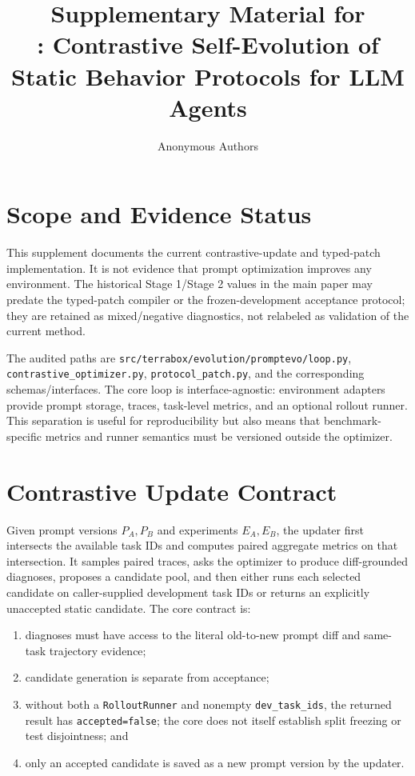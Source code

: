 \documentclass[10pt]{article}
\title{Supplementary Material for \\ \method: Contrastive Self-Evolution of Static Behavior Protocols for LLM Agents}
\author{Anonymous Authors}
\date{}
\begin{document}
\maketitle

\section{Scope and Evidence Status}
This supplement documents the current contrastive-update and typed-patch implementation. It is not evidence that prompt optimization improves any environment. The historical Stage 1/Stage 2 values in the main paper may predate the typed-patch compiler or the frozen-development acceptance protocol; they are retained as mixed/negative diagnostics, not relabeled as validation of the current method.

The audited paths are \texttt{src/terrabox/evolution/promptevo/loop.py}, \texttt{contrastive\_optimizer.py}, \texttt{protocol\_patch.py}, and the corresponding schemas/interfaces. The core loop is interface-agnostic: environment adapters provide prompt storage, traces, task-level metrics, and an optional rollout runner. This separation is useful for reproducibility but also means that benchmark-specific metrics and runner semantics must be versioned outside the optimizer.

\section{Contrastive Update Contract}
Given prompt versions $P_A,P_B$ and experiments $E_A,E_B$, the updater first intersects the available task IDs and computes paired aggregate metrics on that intersection. It samples paired traces, asks the optimizer to produce diff-grounded diagnoses, proposes a candidate pool, and then either runs each selected candidate on caller-supplied development task IDs or returns an explicitly unaccepted static candidate. The core contract is:
\begin{enumerate}
\item diagnoses must have access to the literal old-to-new prompt diff and same-task trajectory evidence;
\item candidate generation is separate from acceptance;
\item without both a \texttt{RolloutRunner} and nonempty \texttt{dev\_task\_ids}, the returned result has \texttt{accepted=false}; the core does not itself establish split freezing or test disjointness; and
\item only an accepted candidate is saved as a new prompt version by the updater.
\end{enumerate}
\end{document}

